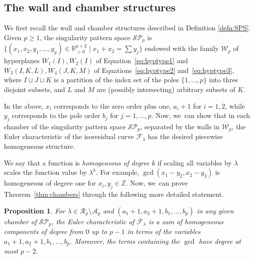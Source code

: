 \documentclass[JEP,XML,SOM,Unicode,NoFloatCountersInSection,published]{cedram}
\newtheorem{prop}[thm]{Proposition}
\theoremstyle{definition}
\begin{document}
\subsection{The wall and chamber structures}\label{sub:Discretecombinatorics}

We first recall the wall and chamber structures described in Definition \ref{defn:SPS}.
Given $p \geq 1$, the singularity pattern space $\mathcal{SP}_{p}$ is $\bigl\{ (x_{1},x_{2},y_{1},\dots,y_{p}) \in \mathbb{R}_{>0}^{p+2} \mid x_{1}+x_{2}= \sum y_{j} \bigr\}$ endowed with the family $\mathcal{W}_{p}$ of hyperplanes $W_{1}(I),W_{2}(I)$ of Equation~\eqref{eq:hyptype1} and $W_{3}(I,K,L),W_{4}(J,K,M)$ of Equations~\eqref{eq:hyptype2} and~\eqref{eq:hyptype3}, where $I \sqcup J \sqcup K$ is a partition of the index set of the poles $\lbrace{ 1,\dots,p \rbrace}$ into three disjoint subsets, and $L$ and $M$ are (possibly intersecting) arbitrary subsets of $K$.

In the above, $x_i$ corresponds to the zero order plus one, \ie $a_i+1$ for $i=1,2$, while $y_j$ corresponds to the pole order $b_j$ for $j=1,\ldots,p$. Now, we~can show that in each chamber of the singularity pattern space $\mathcal{SP}_p$, separated by the walls in $\mathcal{W}_{p}$, the Euler characteristic of the isoresidual curve $\overline{\mathcal{F}}_\lambda$ has the desired piecewise homogeneous structure.

We say that a function is {\em homogeneous of degree $k$} if scaling all variables by $\lambda$ scales the function value by $\lambda^k$. For example, $\gcd(x_1 - y_2, x_2 - y_3)$ is homogeneous of degree one for
$x_i, y_j\in \mathbb{Z}$. Now, we~can prove Theorem~\ref{thm:chambers} through the following more detailed statement.

\begin{prop}\label{prop:chambers}
For $\lambda \in \mathcal{R}_{p}\setminus \mathcal{A}_{p}$ and $(a_1+1, a_2+1, b_1, \ldots, b_p)$ in any given chamber of $\mathcal{SP}_p$, the Euler characteristic of $\overline{\mathcal F}_\lambda$ is a sum of homogeneous components of degree from $0$ up to $p-1$ in terms of the variables $a_{1}+1,a_{2}+1,b_{1},\dots,b_{p}$. Moreover, the terms containing the $\gcd$ have degree at most $p-2$.
\end{prop}
\end{document}
